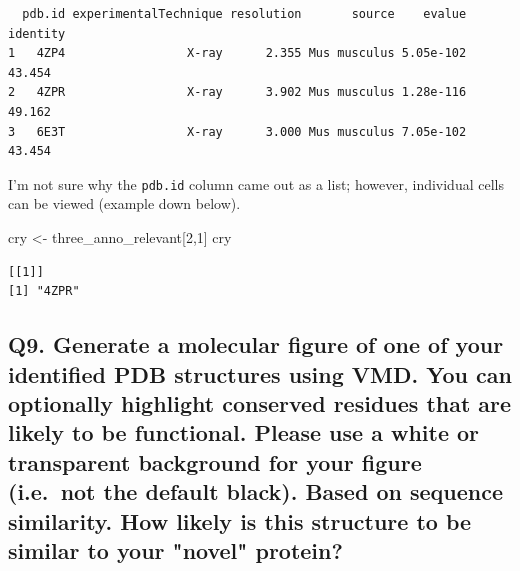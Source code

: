 \documentclass[
  letterpaper,
  DIV=11,
  numbers=noendperiod]{scrartcl}
\newenvironment{Shaded}{\begin{snugshade}}{\end{snugshade}}
\newcommand{\DecValTok}[1]{\textcolor[rgb]{0.68,0.00,0.00}{#1}}
\newcommand{\NormalTok}[1]{\textcolor[rgb]{0.00,0.23,0.31}{#1}}
\newcommand{\OtherTok}[1]{\textcolor[rgb]{0.00,0.23,0.31}{#1}}
\begin{document}
\begin{verbatim}
  pdb.id experimentalTechnique resolution       source    evalue identity
1   4ZP4                 X-ray      2.355 Mus musculus 5.05e-102   43.454
2   4ZPR                 X-ray      3.902 Mus musculus 1.28e-116   49.162
3   6E3T                 X-ray      3.000 Mus musculus 7.05e-102   43.454
\end{verbatim}

I'm not sure why the \texttt{pdb.id} column came out as a list; however,
individual cells can be viewed (example down below).

\begin{Shaded}
\begin{Highlighting}[]
\NormalTok{cry }\OtherTok{\textless{}{-}}\NormalTok{ three\_anno\_relevant[}\DecValTok{2}\NormalTok{,}\DecValTok{1}\NormalTok{]}
\NormalTok{cry}
\end{Highlighting}
\end{Shaded}

\begin{verbatim}
[[1]]
[1] "4ZPR"
\end{verbatim}

\hypertarget{q9.-generate-a-molecular-figure-of-one-of-your-identified-pdb-structures-using-vmd.-you-can-optionally-highlight-conserved-residues-that-are-likely-to-be-functional.-please-use-a-white-or-transparent-background-for-your-figure-i.e.-not-the-default-black.-based-on-sequence-similarity.-how-likely-is-this-structure-to-be-similar-to-your-novel-protein}{%
\subsection{\texorpdfstring{Q9. \textbf{Generate a molecular figure of
one of your identified PDB structures using VMD. You can optionally
highlight conserved residues that are likely to be functional. Please
use a white or transparent background for your figure (i.e.~not the
default black). Based on sequence similarity. How likely is this
structure to be similar to your "novel"
protein?}}{Q9. Generate a molecular figure of one of your identified PDB structures using VMD. You can optionally highlight conserved residues that are likely to be functional. Please use a white or transparent background for your figure (i.e.~not the default black). Based on sequence similarity. How likely is this structure to be similar to your "novel" protein?}}\label{q9.-generate-a-molecular-figure-of-one-of-your-identified-pdb-structures-using-vmd.-you-can-optionally-highlight-conserved-residues-that-are-likely-to-be-functional.-please-use-a-white-or-transparent-background-for-your-figure-i.e.-not-the-default-black.-based-on-sequence-similarity.-how-likely-is-this-structure-to-be-similar-to-your-novel-protein}}
\end{document}
